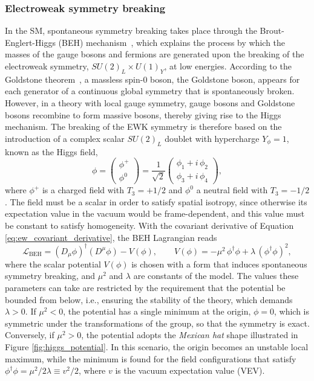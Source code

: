 \subsubsection{Electroweak symmetry breaking}
\label{subsubsec:EWSB}
In the SM, spontaneous symmetry breaking takes place through the Brout-Englert-Higgs (BEH) mechanism~\cite{Englert:1964et,Higgs:1964ia,Higgs:1964pj,Guralnik:1964eu}, which explains the process by which the masses of the gauge bosons and fermions are generated upon the breaking of the electroweak symmetry, $SU(2)_L\times U(1)_Y$, at low energies. According to the Goldstone theorem~\cite{Goldstone:1961eq,Goldstone:1962es}, a massless spin-0 boson, the Goldstone boson, appears for each generator of a continuous global symmetry that is spontaneously broken. However, in a theory with local gauge symmetry, gauge bosons and Goldstone bosons recombine to form massive bosons, thereby giving rise to the Higgs mechanism. The breaking of the EWK symmetry is therefore based on the introduction of a complex scalar $SU(2)_L$ doublet with hypercharge $Y_\phi=1$, known as the Higgs field,
\begin{equation}
    \phi = \begin{pmatrix} \phi^{+} \\ \phi^{0} \end{pmatrix} = \frac{1}{\sqrt{2}} \begin{pmatrix} \phi_{1} + i\,\phi_{2} \\ \phi_{3} + i\,\phi_{4} \end{pmatrix},
    \label{eq:higgs_doublet}
\end{equation}
%
where $\phi^+$ is a charged field with $T_3=+1/2$ and $\phi^0$ a neutral field with $T_3=-1/2$. The field must be a scalar in order to satisfy spatial isotropy, since otherwise its expectation value in the vacuum would be frame-dependent, and this value must be constant to satisfy homogeneity. With the covariant derivative of Equation \ref{eq:ew_covariant_derivative}, the BEH Lagrangian reads
\begin{equation}
    \mathcal{L}_{\text{BEH}} = (D_\mu \phi)^\dagger (D^\mu \phi) - V(\phi), \qquad V(\phi) = -\mu^2\,\phi^\dagger \phi + \lambda\,(\phi^\dagger \phi)^2,
    \label{higgs_potential}
\end{equation}
%
where the scalar potential $V(\phi)$ is chosen with a form that induces spontaneous symmetry breaking, and $\mu^2$ and $\lambda$ are constants of the model. The values these parameters can take are restricted by the requirement that the potential be bounded from below, i.e., ensuring the stability of the theory, which demands $\lambda>0$. If $\mu^2<0$, the potential has a single minimum at the origin, $\phi=0$, which is symmetric under the transformations of the group, so that the symmetry is exact. Conversely, if $\mu^2>0$, the potential adopts the \textit{Mexican hat} shape illustrated in Figure \ref{fig:higgs_potential}. In this scenario, the origin becomes an unstable local maximum, while the minimum is found for the field configurations that satisfy $\phi^\dagger \phi = \mu^2/2\lambda \equiv v^2/2$, where $v$ is the vacuum expectation value (VEV).
